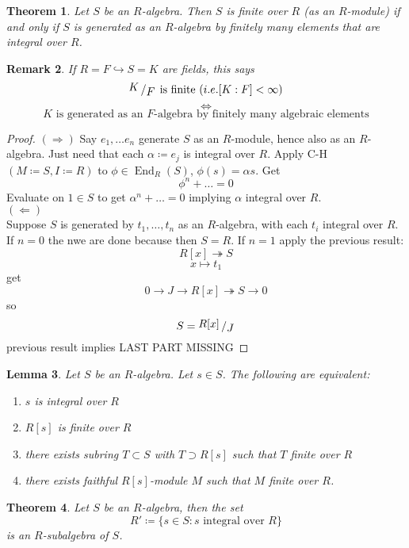 \documentclass[12pt]{article}
\DeclareMathOperator{\End}{End}
\newcommand{\bigslant}[2]{{\raisebox{.2em}{$#1$}\left/\raisebox{-.2em}{$#2$}\right.}}
\newtheorem{theorem}{Theorem}
\newtheorem{lemma}[theorem]{Lemma}
\newtheorem{remark}[theorem]{Remark}
\theoremstyle{definition}
\begin{document}
\begin{theorem}
Let $S$ be an $R$-algebra. Then $S$ is finite over $R$ (as an $R$-module) if and only if $S$ is generated as an $R$-algebra by finitely many elements that are integral over $R$.
\end{theorem}
\begin{remark}
If $R = F \hookrightarrow S =K$ are fields, this says
\[
\bigslant{K}{F}\text{ is finite } (i.e. [K:F]<\infty)
\]
\[
 \iff 
\]
\[
K\text{ is generated as an $F$-algebra by finitely many algebraic elements}
\]
\end{remark}
\begin{proof}
$(\Rightarrow)$ Say $e_1,\dots e_n$ generate $S$ as an $R$-module, hence also as an $R$-algebra. Just need that each $\alpha \coloneqq e_j$ is integral over $R$. Apply C-H $(M \coloneqq S, I\coloneqq R)$ to $\phi \in \End_R(S)$, $\phi(s) = \alpha s$. Get
\[
\phi^n + \dots = 0
\]
Evaluate on $1\in S$ to get $\alpha^n + \dots = 0$ implying $\alpha$ integral over $R$.\\
$(\Leftarrow)$\\
Suppose $S$ is generated by $t_1,\dots , t_n$ as an $R$-algebra, with each $t_i$ integral over $R$. If $n=0$ the nwe are done because then $S=R$. If $n=1$ apply the previous result:
\[
R[x]\twoheadrightarrow S
\]
\[
x \mapsto t_1
\]
get 
\[
0 \rightarrow J \rightarrow R[x] \twoheadrightarrow S \rightarrow 0
\]
so
\[
S = \bigslant{R[x]}{J}
\]
previous result implies 
LAST PART MISSING
\end{proof}
\begin{lemma}
Let $S$ be an $R$-algebra. Let $s\in S$. The following are equivalent:
\begin{enumerate}
    \item $s$ is integral over $R$
    \item $R[s]$ is finite over $R$
    \item there exists subring $T\subset S$ with $T \supset R[s]$ such that $T$ finite over $R$
    \item there exists faithful $R[s]$-module $M$ such that $M$ finite over $R$.
\end{enumerate}
\end{lemma}
\date{01.11.2018}
\begin{theorem}
Let $S$ be an $R$-algebra, then the set
\[
R'\coloneqq \{s\in S: s\text{ integral over }R\}
\]
is an $R$-subalgebra of $S$.
\end{theorem}
\end{document}
